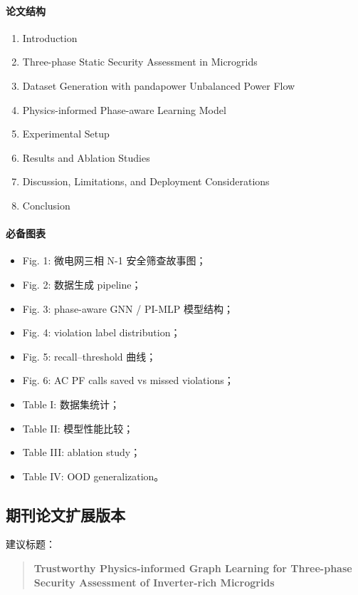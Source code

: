 \documentclass[UTF8,11pt]{ctexart}
\begin{document}
\paragraph{论文结构}
\begin{enumerate}
    \item Introduction
    \item Three-phase Static Security Assessment in Microgrids
    \item Dataset Generation with pandapower Unbalanced Power Flow
    \item Physics-informed Phase-aware Learning Model
    \item Experimental Setup
    \item Results and Ablation Studies
    \item Discussion, Limitations, and Deployment Considerations
    \item Conclusion
\end{enumerate}

\paragraph{必备图表}
\begin{itemize}
    \item Fig. 1: 微电网三相 N-1 安全筛查故事图；
    \item Fig. 2: 数据生成 pipeline；
    \item Fig. 3: phase-aware GNN / PI-MLP 模型结构；
    \item Fig. 4: violation label distribution；
    \item Fig. 5: recall--threshold 曲线；
    \item Fig. 6: AC PF calls saved vs missed violations；
    \item Table I: 数据集统计；
    \item Table II: 模型性能比较；
    \item Table III: ablation study；
    \item Table IV: OOD generalization。
\end{itemize}

\subsection{期刊论文扩展版本}

建议标题：

\begin{quote}
\textbf{Trustworthy Physics-informed Graph Learning for Three-phase Security Assessment of Inverter-rich Microgrids}
\end{quote}
\end{document}
